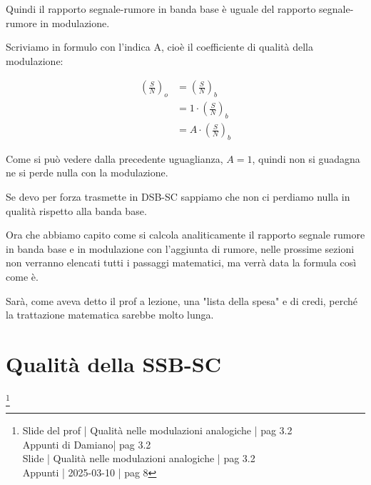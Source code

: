 Quindi il rapporto segnale-rumore in banda base è uguale del rapporto segnale-rumore in modulazione. \newline 

Scriviamo in formulo con l'indica A, cioè il coefficiente di qualità della modulazione: 

{
    \Large 
    \begin{equation}
        \begin{split}
            \left(
                \frac{S}{N}
        \right)_{o}
        &=
        \left(
                \frac{S}{N}
        \right)_{b}
        \\
        &= 
        1 \cdot  \left(
                \frac{S}{N}
        \right)_{b}
        \\
        &= 
        A \cdot  \left(
                \frac{S}{N}
        \right)_{b}
        \end{split}
    \end{equation}
}

Come si può vedere dalla precedente uguaglianza, $A = 1$, 
quindi non si guadagna ne si perde nulla con la modulazione. \newline 

Se devo per forza trasmette in DSB-SC sappiamo che non ci perdiamo nulla in qualità rispetto alla banda base. \newline 

\newpage 

\begin{tcolorbox}
    Ora che abbiamo capito come si calcola analiticamente il rapporto segnale rumore in banda base e in modulazione con l'aggiunta di rumore, 
    nelle prossime sezioni non verranno elencati tutti i passaggi matematici, ma verrà data la formula così come è. \newline 

    Sarà, come aveva detto il prof a lezione, una "lista della spesa" e di credi, perché la trattazione matematica sarebbe molto lunga.
\end{tcolorbox}

\section{Qualità della SSB-SC}
\footnote{Slide del prof | Qualità nelle modulazioni analogiche | pag 3.2 \\  
Appunti di Damiano| pag 3.2 \\
Slide | Qualità nelle modulazioni analogiche | pag 3.2 \\
Appunti | 2025-03-10 | pag 8
} 

